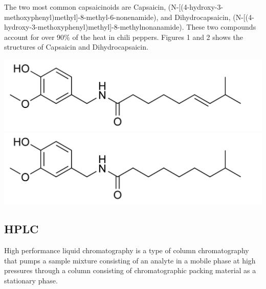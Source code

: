 \documentclass{article}
\begin{document}
\begin{multicols}{2}
{    The two most common capsaicinoids are Capsaicin,
    (N-[(4-hydroxy-3-methoxyphenyl)methyl]-8-methyl-6-nonenamide), and
    Dihydrocapsaicin,
    (N-[(4-hydroxy-3-methoxyphenyl)methyl]-8-methylnonanamide).
    These two compounds account for over 90\% of the heat in chili peppers.
    Figures 1 and 2 shows the structures of Capsaicin and Dihydrocapsaicin.
    \begin{center} 
    \includegraphics[scale=0.15]{capsaicin}
    \includegraphics[scale=0.15]{dihydrocapsaicin}
    \end{center}

\subsection*{HPLC}
High performance liquid chromatography is a type of column chromatography that
    pumps a sample mixture consisting of an analyte in a mobile phase at high
    pressures through a column consisting of chromatographic packing material as
    a stationary phase. 

}
\end{multicols}
\end{document}
